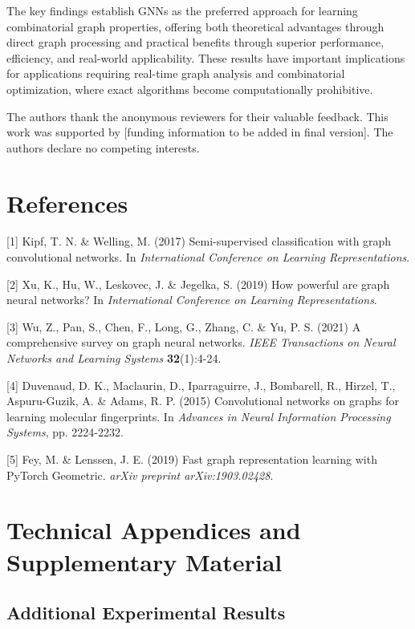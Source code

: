 \documentclass{article}
\begin{document}
The key findings establish GNNs as the preferred approach for learning combinatorial graph properties, offering both theoretical advantages through direct graph processing and practical benefits through superior performance, efficiency, and real-world applicability. These results have important implications for applications requiring real-time graph analysis and combinatorial optimization, where exact algorithms become computationally prohibitive.

\begin{ack}
The authors thank the anonymous reviewers for their valuable feedback. This work was supported by [funding information to be added in final version]. The authors declare no competing interests.
\end{ack}

\section*{References}

{
\small

[1] Kipf, T. N. \& Welling, M. (2017) Semi-supervised classification with graph convolutional networks. In {\it International Conference on Learning Representations}.

[2] Xu, K., Hu, W., Leskovec, J. \& Jegelka, S. (2019) How powerful are graph neural networks? In {\it International Conference on Learning Representations}.

[3] Wu, Z., Pan, S., Chen, F., Long, G., Zhang, C. \& Yu, P. S. (2021) A comprehensive survey on graph neural networks. {\it IEEE Transactions on Neural Networks and Learning Systems} {\bf 32}(1):4-24.

[4] Duvenaud, D. K., Maclaurin, D., Iparraguirre, J., Bombarell, R., Hirzel, T., Aspuru-Guzik, A. \& Adams, R. P. (2015) Convolutional networks on graphs for learning molecular fingerprints. In {\it Advances in Neural Information Processing Systems}, pp. 2224-2232.

[5] Fey, M. \& Lenssen, J. E. (2019) Fast graph representation learning with PyTorch Geometric. {\it arXiv preprint arXiv:1903.02428}.

}

\appendix

\section{Technical Appendices and Supplementary Material}

\subsection{Additional Experimental Results}
\end{document}
